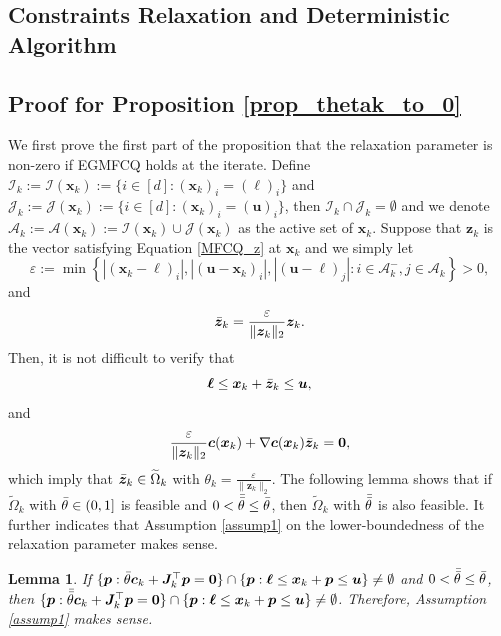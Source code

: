 \documentclass[aos]{imsart}
\numberwithin{equation}{section}
\theoremstyle{plain}
\newtheorem{lemma}{Lemma}
\begin{document}
\begin{appendix}
\newpage
\section{Constraints Relaxation and Deterministic Algorithm}
\label{sec:appendix1}
\subsection{Proof for Proposition \ref{prop_thetak_to_0}}
\label{sec:appendix1.1}
We first prove the first part of the proposition that the relaxation parameter is non-zero if EGMFCQ holds at the iterate. Define $\mathcal{I}_k := \mathcal{I}(\bm{x}_k):= \{ i \in [d]: (\bm{x}_k)_i = (\bm{\ell})_i \}$ and  $\mathcal{J}_k := \mathcal{J}(\bm{x}_k):= \{ i \in [d]: (\bm{x}_k)_i = (\bm{u})_i \}$, then $\mathcal{I}_k \cap \mathcal{J}_k = \emptyset$ and we denote $\mathcal{A}_k := \mathcal{A}(\bm{x}_k) := \mathcal{I}(\bm{x}_k) \cup \mathcal{J}(\bm{x}_k)$ as the active set of $\bm{x}_k$. Suppose that $\bm{z}_k$ is the vector satisfying Equation \eqref{MFCQ_z} at $\bm{x}_k$ and we simply let 
$$\varepsilon := \min\left\{\left|(\bm{x}_k - \bm{\ell})_{i}\right|, \left|(\bm{u} -\bm{x}_k)_{i}\right| , \left|(\bm{u} - \bm{\ell})_{j}\right| : i \in \mathcal{A}_k^{-}, j \in \mathcal{A}_k\right\}>0,$$
and
\begin{equation*}
    \Bar{\bm{z}}_k = \frac{\varepsilon}{\|\bm{z}_k\|_2} \bm{z}_k.
\end{equation*}
Then, it is not difficult to verify that 
\begin{equation*}
    \bm{\ell} \leq \bm{x}_k + \Bar{\bm{z}}_k \leq \bm{u},
\end{equation*}
and
\begin{equation}
\label{construct_theta_k}
    \frac{\varepsilon}{\|\bm{z}_k\|_2} \bm{c}(\bm{x}_k) + \nabla \bm{c}(\bm{x}_k) \Bar{\bm{z}}_k = \bm{0},
\end{equation}
which imply that $\Bar{\bm{z}}_k \in \widetilde{\Omega}_k$ with $\theta_k = \frac{\varepsilon}{\|\bm{z}_k\|_2}$. The following lemma shows that if $\widetilde{\Omega}_k$ with $\Bar{\theta} \in (0,1]$ is feasible and $0<\Bar{\Bar{\theta}} \leq \Bar{\theta}$, then $\widetilde{\Omega}_k$ with $\Bar{\Bar{\theta}}$ is also feasible. It further indicates that Assumption \ref{assump1} on the lower-boundedness of the relaxation parameter makes sense. 


\begin{lemma}
\label{prop_reason}
    If $\{\bm{p}: \Bar{\theta} \bm{c}_k +  \bm{J}_k^{\top} \bm{p} = \bm{0}\} \cap \{\bm{p}: \bm{\ell} \leq \bm{x}_k + \bm{p} \leq \bm{u}\} \neq \emptyset$ and $0<\Bar{\Bar{\theta}} \leq \Bar{\theta}$, then $\{\bm{p}: \Bar{\Bar{\theta}} \bm{c}_k +  \bm{J}_k^{\top} \bm{p} = \bm{0}\} \cap \{\bm{p}: \bm{\ell} \leq \bm{x}_k + \bm{p} \leq \bm{u}\} \neq \emptyset$. Therefore, Assumption \ref{assump1} makes sense. 
\end{lemma}



\end{appendix}
\end{document}
